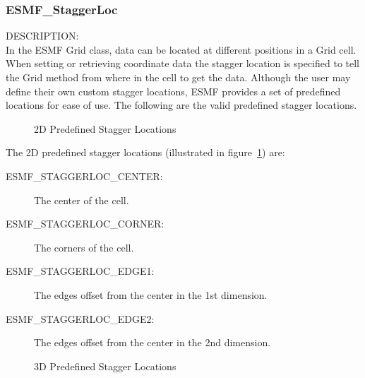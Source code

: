 \subsubsection{ESMF\_StaggerLoc}\label{sec:opt:staggerloc}

 {\sf DESCRIPTION:\\}
 In the ESMF Grid class, data can be located at different positions in a
 Grid cell.  When setting or retrieving coordinate data the stagger location is
 specified to tell the Grid method  from where in the cell to get the data. 
 Although the user may define their own custom stagger locations, 
 ESMF provides a set of predefined locations for ease of use. The
following are the valid predefined stagger locations. 

\medskip

\begin{center}
\begin{figure}
\center
{}
\caption{2D Predefined Stagger Locations}
\label{fig:gridstaggerloc2d}
\end{figure}
\end{center}

The 2D predefined stagger locations (illustrated in figure~\ref{fig:gridstaggerloc2d}) are:\\
\begin{description}
\item [ESMF\_STAGGERLOC\_CENTER:] The center of the cell.
\item [ESMF\_STAGGERLOC\_CORNER:] The corners of the cell.
\item [ESMF\_STAGGERLOC\_EDGE1:] The edges offset from the center in the 1st dimension.
\item [ESMF\_STAGGERLOC\_EDGE2:] The edges offset from the center in the 2nd dimension.
\end{description}

\medskip

\begin{center}
\begin{figure}
\center
{}
\caption{3D Predefined Stagger Locations}
\label{fig:gridstaggerloc3d}
\end{figure}
\end{center}


